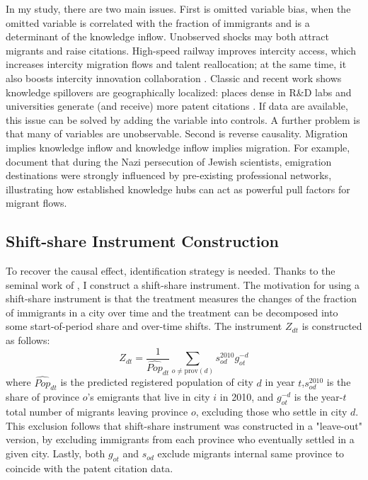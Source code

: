 \documentclass[12pt]{article}
\begin{document}
In my study, there are two main issues. First is omitted variable bias, when the omitted variable is correlated with the fraction of immigrants and is a determinant of the knowledge inflow. Unobserved shocks may both attract migrants and raise citations. High-speed railway improves intercity access, which increases intercity migration flows and talent reallocation; at the same time, it also boosts intercity innovation collaboration \citep{wangHighspeedRailUrban2024}. Classic and recent work shows knowledge spillovers are geographically localized: places dense in R\&D labs and universities generate (and receive) more patent citations \citep{jaffeGeographicLocalizationKnowledge1993,kwonKnowledgeSpilloversPatent2022}. If data are available, this issue can be solved by adding the variable into controls. A further problem is that many of variables are unobservable. Second is reverse causality. Migration implies knowledge inflow and knowledge inflow implies migration. For example, \cite{moserGermanJewishEmigres2014} document that during the Nazi persecution of Jewish scientists, emigration destinations were strongly influenced by pre-existing professional networks, illustrating how established knowledge hubs can act as powerful pull factors for migrant flows.


\subsection{Shift-share Instrument Construction}\label{sec:instrument}

To recover the causal effect, identification strategy is needed. Thanks to the seminal work of \citep{cardImmigrantInflowsNative2001,borusyakQuasiExperimentalShiftShareResearch2022}, I construct a shift-share instrument. The motivation for using a shift-share instrument is that the treatment measures the changes of the fraction of immigrants in a city over time and the treatment can be decomposed into some start-of-period share and over-time shifts. The instrument $Z_{dt}$ is constructed as follows:
\begin{equation}
 Z_{dt}=\frac{1}{\hat{Pop}_{dt}}\sum_{o \neq \text{prov}(d)} s_{od}^{2010} g_{ot}^{-d}
\end{equation}
where $\hat{Pop}_{dt}$ is the predicted registered population of city $d$ in year $t$,$s_{od}^{2010}$ is the share of province $o$'s emigrants that live in city $i$ in 2010, and $g_{ot}^{-d}$ is the year-$t$ total number of migrants leaving province $o$, excluding those who settle in city $d$. This exclusion follows \cite{tabelliniGiftsImmigrantsWoes2019} that shift-share instrument was constructed in a "leave-out" version, by excluding immigrants from each province who eventually settled in a given city. Lastly, both $g_{ot}$ and $s_{od}$ exclude migrants internal same province to coincide with the patent citation data. 
\end{document}
